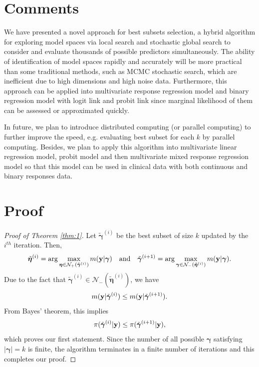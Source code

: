 \documentclass[12pt]{article}
\def\uy{{\bf y}}
\def\bg{{\boldsymbol \gamma}}
\def\ueta{{\boldsymbol \eta}}
\def\ueta{{\boldsymbol \eta}}
\begin{document}
\section{Comments}
We have presented a novel approach for best subsets selection, a hybrid algorithm for exploring model spaces via local search and stochastic global search to consider and evaluate thousands of possible predictors simultaneously. The ability of identification of model spaces rapidly and accurately will be more practical than some traditional methods, such as MCMC stochastic search, which are inefficient due to high dimensions and high noise data. Furthermore, this approach can be applied into multivariate response regression model and binary regression model with logit link and probit link since marginal likelihood of them can be assessed or approximated quickly.

In future, we plan to introduce distributed computing (or parallel computing) to further improve the speed, e.g. evaluating best subset for each $k$ by parallel computing. Besides, we plan to apply this algorithm into multivariate linear regression model, probit model and then multivariate mixed response regression model so that this model can be used in clinical data with both continuous and binary responses data.

\newpage
\appendix
\section{Proof}\label{app:01}
\begin{proof}[Proof of Theorem \ref{thm:1}] Let $\tilde{\bg}^{(i)}$ be the best subset of size $k$ updated by the $i^{th}$ iteration. Then,
 $$\tilde{\ueta}^{(i)}=\arg\max_{\ueta  \in \mathcal{N}_+(\tilde{\bg}^{(i)}  ) } m(\uy|\bg)\quad \text{and}\quad \tilde{\bg}^{(i+1)} = \arg\max_{\bg  \in \mathcal{N}_-(\tilde{\ueta}^{(i)} ) } m(\uy|\bg).$$
 Due to the fact that $\tilde{\bg}^{(i)} \in \mathcal{N}_-(\tilde{\ueta}^{(i)} ) $, we have
 $$m(\uy|\tilde{\bg}^{(i)} ) \leq m(\uy|\tilde{\bg}^{(i+1)}).$$
 From Bayes' theorem, this implies
 $$\pi(\tilde{\bg}^{(i)}|\uy ) \leq \pi(\tilde{\bg}^{(i+1)}|\uy),$$
 which proves our first statement.
 Since the number of all possible $\bg$ satisfying $|\bg|=k $ is finite, the algorithm terminates in a finite number of iterations and this completes our proof.
\end{proof}
\end{document}
